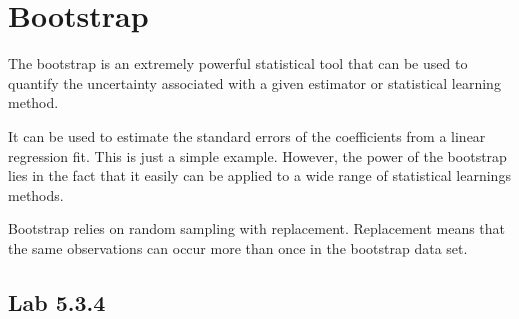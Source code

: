 \chapter{Bootstrap}
\label{chp:boots}

The bootstrap is an extremely powerful statistical tool that can be used to quantify the uncertainty associated with a given estimator or statistical learning method.

It can be used to estimate the standard errors of the coefficients from a linear regression fit. This is just a simple example. However, the power of the bootstrap lies in the fact that it easily can be applied to a wide range of statistical learnings methods.

Bootstrap relies on random sampling with replacement. Replacement means that the same observations can occur more than once in the bootstrap data set.
 


\section{Lab 5.3.4}
